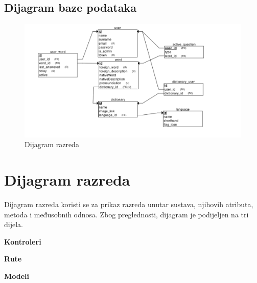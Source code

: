 					
			\subsection{Dijagram baze podataka}
				\begin{figure}[H]
					\includegraphics[scale=0.5]{dijagrami/baza_dijagram.png} 
					\centering
					\caption{Dijagram razreda}
					\label{fig:class_diagram}
				\end{figure}			
			\eject
			
			
		\section{Dijagram razreda}        

			
            Dijagram razreda koristi se za prikaz razreda unutar sustava, njihovih atributa, metoda i međusobnih odnosa. Zbog preglednosti, dijagram je podijeljen na tri dijela.
            \begin{packed_item}
                \item \textbf{Kontroleri}
                \item \textbf{Rute}
                \item \textbf{Modeli}
            \end{packed_item}
           

